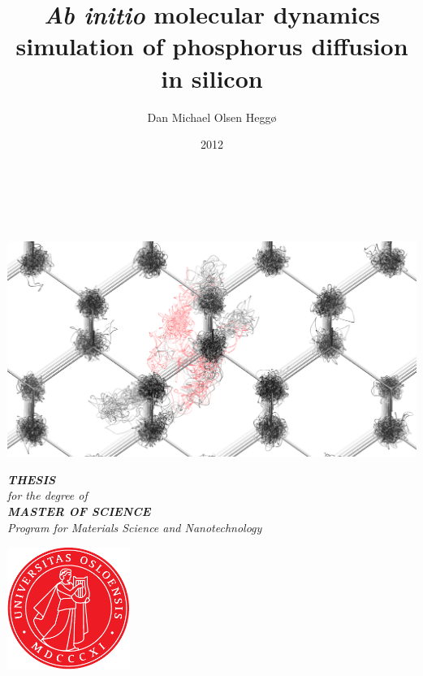 \documentclass[a4paper]{article}
\begin{document}
\title{\textit{Ab initio} molecular dynamics simulation of phosphorus diffusion in silicon}
\author{Dan Michael Olsen Heggø}
\date{2012}


\pagestyle{empty}
\begin{center}        %
  \LARGE
  \textbf{\thetitle} \\
  \Large
  \vspace{10mm}
  \large
  \textbf{\theauthor} \\
  \vspace{12mm}
  \centerline{\includegraphics[width=14cm]{dance1.png}}
  \vspace{12mm}
  \Large
  {\bf{\textsl{THESIS}}} \\
  \textsl{for the degree of} \\
  \vspace{2mm}
  {\bf{\textsl{MASTER OF SCIENCE}}} \\
  \vspace{2mm}
  {\large \textsl {Program for Materials Science and Nanotechnology}}\\
  \vspace{5mm}
  \centerline{\includegraphics[width=4cm,height=4cm]{apollonseglet_farge}}

\end{center}
\end{document}
